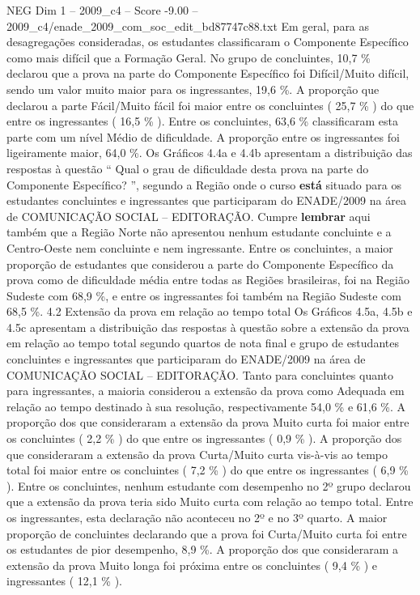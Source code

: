 \begin{textsample}{NEG Dim 1 – 2009\_c4 – Score -9.00 – 2009\_c4/enade\_2009\_com\_soc\_edit\_bd87747c88.txt}
Em geral, para as desagregações consideradas, os estudantes classificaram o Componente Específico como mais difícil que a Formação Geral.
No grupo de concluintes, 10,7 \% declarou que a prova na parte do Componente Específico foi Difícil/Muito difícil, sendo um valor muito maior para os ingressantes, 19,6 \%.
A proporção que declarou a parte Fácil/Muito fácil foi maior entre os concluintes ( 25,7 \% ) do que entre os ingressantes ( 16,5 \% ).
Entre os concluintes, 63,6 \% classificaram esta parte com um nível Médio de dificuldade.
A proporção entre os ingressantes foi ligeiramente maior, 64,0 \%.
Os Gráficos 4.4a e 4.4b apresentam a distribuição das respostas à questão “ Qual o grau de dificuldade desta prova na parte do Componente Específico? ”, segundo a Região onde o curso \textbf{está} situado para os estudantes concluintes e ingressantes que participaram do ENADE/2009 na área de COMUNICAÇÃO SOCIAL – EDITORAÇÃO.
Cumpre \textbf{lembrar} aqui também que a Região Norte não apresentou nenhum estudante concluinte e a Centro-Oeste nem concluinte e nem ingressante.
Entre os concluintes, a maior proporção de estudantes que considerou a parte do Componente Específico da prova como de dificuldade média entre todas as Regiões brasileiras, foi na Região Sudeste com 68,9 \%, e entre os ingressantes foi também na Região Sudeste com 68,5 \%. 4.2 Extensão da prova em relação ao tempo total Os Gráficos 4.5a, 4.5b e 4.5c apresentam a distribuição das respostas à questão sobre a extensão da prova em relação ao tempo total segundo quartos de nota final e grupo de estudantes concluintes e ingressantes que participaram do ENADE/2009 na área de COMUNICAÇÃO SOCIAL – EDITORAÇÃO.
Tanto para concluintes quanto para ingressantes, a maioria considerou a extensão da prova como Adequada em relação ao tempo destinado à sua resolução, respectivamente 54,0 \% e 61,6 \%.
A proporção dos que consideraram a extensão da prova Muito curta foi maior entre os concluintes ( 2,2 \% ) do que entre os ingressantes ( 0,9 \% ).
A proporção dos que consideraram a extensão da prova Curta/Muito curta vis-à-vis ao tempo total foi maior entre os concluintes ( 7,2 \% ) do que entre os ingressantes ( 6,9 \% ).
Entre os concluintes, nenhum estudante com desempenho no 2º grupo declarou que a extensão da prova teria sido Muito curta com relação ao tempo total.
Entre os ingressantes, esta declaração não aconteceu no 2º e no 3º quarto.
A maior proporção de concluintes declarando que a prova foi Curta/Muito curta foi entre os estudantes de pior desempenho, 8,9 \%.
A proporção dos que consideraram a extensão da prova Muito longa foi próxima entre os concluintes ( 9,4 \% ) e ingressantes ( 12,1 \% ).

\end{textsample}
